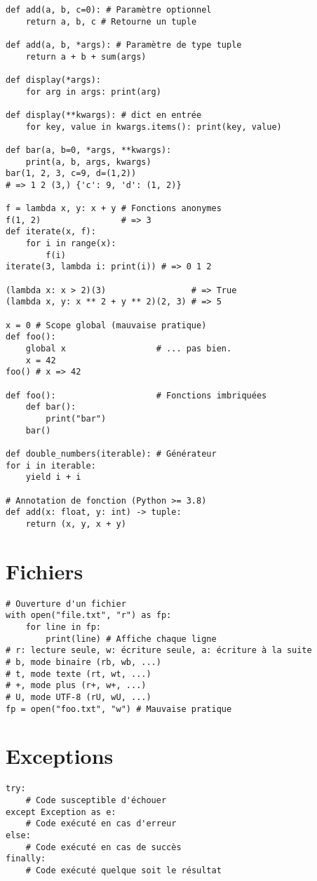 \documentclass{article}
\begin{document}
\begin{multicols*}{4}
\begin{lstlisting}
def add(a, b, c=0): # Paramètre optionnel
    return a, b, c # Retourne un tuple

def add(a, b, *args): # Paramètre de type tuple
    return a + b + sum(args)

def display(*args):
    for arg in args: print(arg)

def display(**kwargs): # dict en entrée
    for key, value in kwargs.items(): print(key, value)

def bar(a, b=0, *args, **kwargs):
    print(a, b, args, kwargs)
bar(1, 2, 3, c=9, d=(1,2))
# => 1 2 (3,) {'c': 9, 'd': (1, 2)}

f = lambda x, y: x + y # Fonctions anonymes
f(1, 2)                # => 3
def iterate(x, f):
    for i in range(x):
        f(i)
iterate(3, lambda i: print(i)) # => 0 1 2

(lambda x: x > 2)(3)                 # => True
(lambda x, y: x ** 2 + y ** 2)(2, 3) # => 5

x = 0 # Scope global (mauvaise pratique)
def foo():
    global x                  # ... pas bien.
    x = 42
foo() # x => 42

def foo():                    # Fonctions imbriquées
    def bar():
        print("bar")
    bar()

def double_numbers(iterable): # Générateur
for i in iterable:
    yield i + i

# Annotation de fonction (Python >= 3.8)
def add(x: float, y: int) -> tuple:
    return (x, y, x + y)
\end{lstlisting}

\section*{Fichiers}
\begin{lstlisting}
# Ouverture d'un fichier
with open("file.txt", "r") as fp:
    for line in fp:
        print(line) # Affiche chaque ligne
# r: lecture seule, w: écriture seule, a: écriture à la suite
# b, mode binaire (rb, wb, ...)
# t, mode texte (rt, wt, ...)
# +, mode plus (r+, w+, ...)
# U, mode UTF-8 (rU, wU, ...)
fp = open("foo.txt", "w") # Mauvaise pratique
\end{lstlisting}

\section*{Exceptions}
\begin{lstlisting}
try:
    # Code susceptible d'échouer
except Exception as e:
    # Code exécuté en cas d'erreur
else:
    # Code exécuté en cas de succès
finally:
    # Code exécuté quelque soit le résultat
\end{lstlisting}


\end{multicols*}
\end{document}
